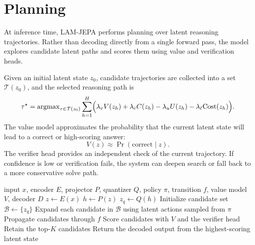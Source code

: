 \documentclass[11pt]{article}
\newcommand{\argmax}{\mathrm{argmax}}
\newcommand{\1}{\mathbbm{1}}
\begin{document}
\section{Planning}
At inference time, LAM-JEPA performs planning over latent reasoning trajectories. Rather than decoding directly from a single forward pass, the model explores candidate latent paths and scores them using value and verification heads.

Given an initial latent state $z_0$, candidate trajectories are collected into a set $\mathcal{T}(z_0)$, and the selected reasoning path is
\begin{equation}
\tau^\star
=
\argmax_{\tau \in \mathcal{T}(z_0)}
\sum_{h=1}^H
\Bigl(
\lambda_v V(z_h)
+
\lambda_c C(z_h)
-
\lambda_u U(z_h)
-
\lambda_\ell \mathrm{Cost}(z_h)
\Bigr).
\end{equation}
The value model approximates the probability that the current latent state will lead to a correct or high-scoring answer:
\begin{equation}
V(z) \approx \Pr(\text{correct} \mid z).
\end{equation}
The verifier head provides an independent check of the current trajectory. If confidence is low or verification fails, the system can deepen search or fall back to a more conservative solve path.

\begin{algorithm}[H]
\caption{LAM-JEPA Planning and Decoding}
\label{alg:planning}
\begin{algorithmic}[1]
\Require input $x$, encoder $E$, projector $P$, quantizer $Q$, policy $\pi$, transition $f$, value model $V$, decoder $D$
\State $z \leftarrow E(x)$
\State $h \leftarrow P(z)$
\State $z_q \leftarrow Q(h)$
\State Initialize candidate set $\mathcal{B} \leftarrow \{z_q\}$
    \State Expand each candidate in $\mathcal{B}$ using latent actions sampled from $\pi$
    \State Propagate candidates through $f$
    \State Score candidates with $V$ and the verifier head
    \State Retain the top-$K$ candidates
\EndFor
\State Return the decoded output from the highest-scoring latent state
\end{algorithmic}
\end{algorithm}
\end{document}
